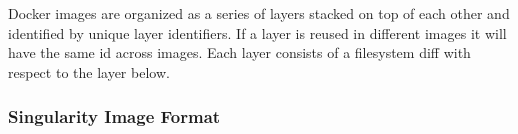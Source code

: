 \documentclass[a4paper,num-refs]{oup-contemporary}
\begin{document}
Docker images are organized as a series of layers stacked on top of each
other and identified by unique layer identifiers. If a layer is reused
in different images it will
have the same id across images. Each layer consists of a filesystem diff
with respect to the layer below. 

\subsubsection{Singularity Image Format}
\end{document}
